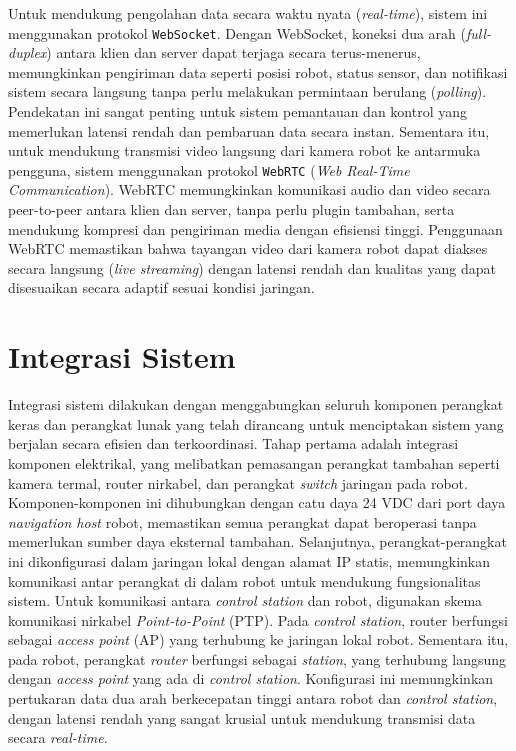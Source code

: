 Untuk mendukung pengolahan data secara waktu nyata (\textit{real-time}), sistem ini menggunakan protokol \texttt{WebSocket}. Dengan WebSocket, koneksi dua arah (\textit{full-duplex}) antara klien dan server dapat terjaga secara terus-menerus, memungkinkan pengiriman data seperti posisi robot, status sensor, dan notifikasi sistem secara langsung tanpa perlu melakukan permintaan berulang (\textit{polling}). Pendekatan ini sangat penting untuk sistem pemantauan dan kontrol yang memerlukan latensi rendah dan pembaruan data secara instan. Sementara itu, untuk mendukung transmisi video langsung dari kamera robot ke antarmuka pengguna, sistem menggunakan protokol \texttt{WebRTC} (\textit{Web Real-Time Communication}). WebRTC memungkinkan komunikasi audio dan video secara peer-to-peer antara klien dan server, tanpa perlu plugin tambahan, serta mendukung kompresi dan pengiriman media dengan efisiensi tinggi. Penggunaan WebRTC memastikan bahwa tayangan video dari kamera robot dapat diakses secara langsung (\textit{live streaming}) dengan latensi rendah dan kualitas yang dapat disesuaikan secara adaptif sesuai kondisi jaringan.


\section{Integrasi Sistem}
Integrasi sistem dilakukan dengan menggabungkan seluruh komponen perangkat keras dan perangkat lunak yang telah dirancang untuk menciptakan sistem yang berjalan secara efisien dan terkoordinasi. Tahap pertama adalah integrasi komponen elektrikal, yang melibatkan pemasangan perangkat tambahan seperti kamera termal, router nirkabel, dan perangkat \emph{switch} jaringan pada robot. Komponen-komponen ini dihubungkan dengan catu daya 24 VDC dari port daya \emph{navigation host} robot, memastikan semua perangkat dapat beroperasi tanpa memerlukan sumber daya eksternal tambahan. Selanjutnya, perangkat-perangkat ini dikonfigurasi dalam jaringan lokal dengan alamat IP statis, memungkinkan komunikasi antar perangkat di dalam robot untuk mendukung fungsionalitas sistem. Untuk komunikasi antara \emph{control station} dan robot, digunakan skema komunikasi nirkabel \emph{Point-to-Point} (PTP). Pada \emph{control station}, router berfungsi sebagai \emph{access point} (AP) yang terhubung ke jaringan lokal robot. Sementara itu, pada robot, perangkat \emph{router} berfungsi sebagai \emph{station}, yang terhubung langsung dengan \emph{access point} yang ada di \emph{control station}. Konfigurasi ini memungkinkan pertukaran data dua arah berkecepatan tinggi antara robot dan \emph{control station}, dengan latensi rendah yang sangat krusial untuk mendukung transmisi data secara \emph{real-time}.

